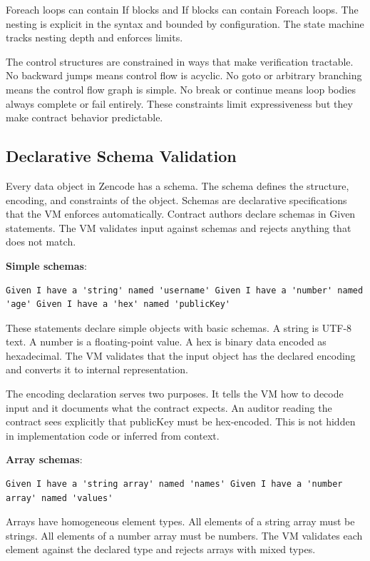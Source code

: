Foreach loops can contain If blocks and If blocks can contain Foreach
loops. The nesting is explicit in the syntax and bounded by
configuration. The state machine tracks nesting depth and enforces
limits.

The control structures are constrained in ways that make verification
tractable. No backward jumps means control flow is acyclic. No goto or
arbitrary branching means the control flow graph is simple. No break
or continue means loop bodies always complete or fail entirely. These
constraints limit expressiveness but they make contract behavior
predictable.

\subsection{Declarative Schema Validation}

Every data object in Zencode has a schema. The schema defines the
structure, encoding, and constraints of the object. Schemas are
declarative specifications that the VM enforces
automatically. Contract authors declare schemas in Given
statements. The VM validates input against schemas and rejects
anything that does not match.

\textbf{Simple schemas}:

\begin{verbatim}
Given I have a 'string' named 'username' Given I have a 'number' named
'age' Given I have a 'hex' named 'publicKey'
\end{verbatim}

These statements declare simple objects with basic schemas. A string
is UTF-8 text. A number is a floating-point value. A hex is binary
data encoded as hexadecimal. The VM validates that the input object
has the declared encoding and converts it to internal representation.

The encoding declaration serves two purposes. It tells the VM how to
decode input and it documents what the contract expects. An auditor
reading the contract sees explicitly that publicKey must be
hex-encoded. This is not hidden in implementation code or inferred
from context.

\textbf{Array schemas}:

\begin{verbatim}
Given I have a 'string array' named 'names' Given I have a 'number
array' named 'values'
\end{verbatim}

Arrays have homogeneous element types. All elements of a string array
must be strings. All elements of a number array must be numbers. The
VM validates each element against the declared type and rejects arrays
with mixed types.

